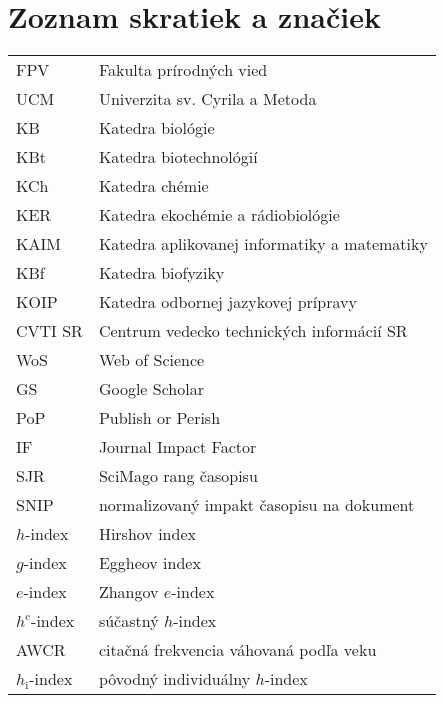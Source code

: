 \chapter*{Zoznam skratiek a značiek}

\begin{flushleft}
  \begin{longtable}[l]{ll} %
    FPV                    & Fakulta prírodných vied \\[1mm]
    UCM                    & Univerzita sv. Cyrila a Metoda \\[1mm]
    KB                     & Katedra biológie \\[1mm]
    KBt                    & Katedra biotechnológií \\[1mm]
    KCh                    & Katedra chémie \\[1mm]
    KER                    & Katedra ekochémie a rádiobiológie \\[1mm]
    KAIM                   & Katedra aplikovanej informatiky a matematiky\\[1mm]
    KBf                    & Katedra biofyziky\\[1mm]
    KOIP                   & Katedra odbornej jazykovej prípravy\\[1mm]
    CVTI SR                & Centrum vedecko technických informácií SR\\[1mm]
    WoS                    & Web of Science \\[1mm]
    GS                     & Google Scholar \\[1mm]
    PoP                    & Publish or Perish \\[1mm]
    IF                     & Journal Impact Factor \\[1mm]
    SJR                    & SciMago rang časopisu \\[1mm]
    SNIP                   & normalizovaný impakt časopisu  na dokument \\[1mm]
    $h$-index              & Hirshov index \\[1mm]
    $g$-index              & Eggheov index \\[1mm]
    $e$-index              & Zhangov $e$-index \\[1mm]
    $h^{\mathrm{c}}$-index & súčastný $h$-index \\[1mm]
    AWCR                   & citačná frekvencia váhovaná podľa veku \\[1mm]
    $h_{\mathrm{i}}$-index & pôvodný individuálny $h$-index  \\[1mm]

\end{longtable}
\end{flushleft}
